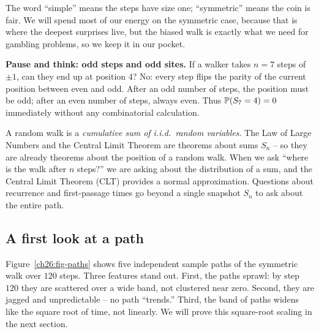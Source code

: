 The word ``simple'' means the steps have size one; ``symmetric'' means the coin
is fair. We will spend most of our energy on the symmetric case, because that
is where the deepest surprises live, but the biased walk is exactly what we
need for gambling problems, so we keep it in our pocket.

\textbf{Pause and think: odd steps and odd sites.} If a walker takes $n = 7$
steps of $\pm 1$, can they end up at position $4$? No: every step flips the
parity of the current position between even and odd. After an odd number of
steps, the position must be odd; after an even number of steps, always even.
Thus $\P(S_7 = 4) = 0$ immediately without any combinatorial calculation.

\begin{happeningbox}
A random walk is a \emph{cumulative sum of i.i.d.\ random variables}. The
Law of Large Numbers and the Central Limit Theorem are theorems about sums
$S_n$ -- so they are already theorems about the position of a random walk. When we ask ``where
is the walk after $n$ steps?'' we are asking about the distribution of a sum,
and the Central Limit Theorem (CLT) provides a normal approximation. Questions about recurrence and first-passage times go beyond a single snapshot $S_n$ to ask about the entire path.
\end{happeningbox}

\subsection{A first look at a path}

Figure~\ref{ch26:fig-paths} shows five independent sample paths of the symmetric walk over $120$ steps.
Three features stand out. First, the paths sprawl: by step $120$ they
are scattered over a wide band, not clustered near zero. Second, they are
jagged and unpredictable -- no path ``trends.'' Third, the band of paths
widens like the square root of time, not linearly. We will prove this
square-root scaling in the next section.

